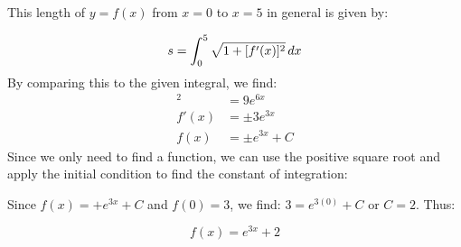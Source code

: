 \documentclass[]{ximera}
\begin{document}
\begin{freeResponse}
This length of $y=f(x)$ from $x=0$ to $x=5$ in general is given by:

\[
s = \int_0^5 \sqrt{1+[f'(x)]^2} \mathop{}\!d x
\]
By comparing this to the given integral, we find:
\begin{align*}
[f'(x)]^2 &= 9e^{6x} \\
f'(x) &= \pm 3e^{3x}  \\
f(x) &= \pm e^{3x}+C  
\end{align*}
Since we only need to find a function, we can use the positive square root and apply the initial condition to find the constant of integration:

Since $f(x) = +e^{3x}+C$ and $f(0)=3$, we find: $3=e^{3(0)}+C$ or $C=2$.  Thus:

\[
f(x) = e^{3x} + 2
\]


\end{freeResponse}
\end{document}
